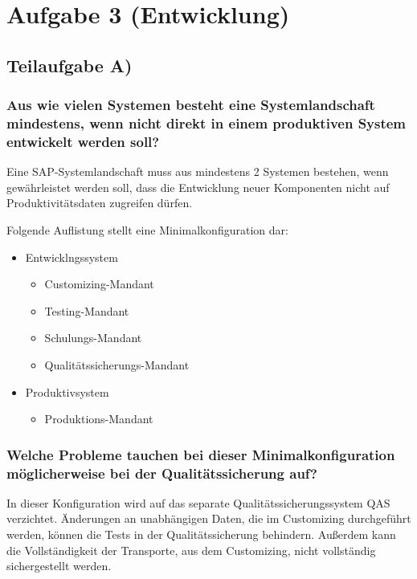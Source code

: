 \section{Aufgabe 3 (Entwicklung)}

\subsection{Teilaufgabe A)}
\subsubsection{Aus wie vielen Systemen besteht eine Systemlandschaft mindestens,
wenn nicht direkt in einem produktiven System entwickelt werden soll? }

Eine SAP-Systemlandschaft muss aus mindestens 2 Systemen bestehen, wenn
gewährleistet werden soll, dass die Entwicklung neuer Komponenten nicht auf
Produktivitätsdaten zugreifen dürfen.

Folgende Auflistung stellt eine Minimalkonfiguration dar:
\begin{itemize}
  \item Entwicklngssystem
  	\begin{itemize}
  	  \item Customizing-Mandant
  	  \item Testing-Mandant
  	  \item Schulungs-Mandant
  	  \item Qualitätssicherungs-Mandant
  	\end{itemize}
  \item Produktivsystem
  	\begin{itemize}
  	  \item Produktions-Mandant
  	\end{itemize}
\end{itemize}

\subsubsection{Welche Probleme tauchen bei dieser
Minimalkonfiguration möglicherweise bei der Qualitätssicherung auf?}

In dieser Konfiguration wird auf das separate Qualitätssicherungssystem QAS
verzichtet. Änderungen an unabhängigen Daten, die im Customizing
durchgeführt werden, können die Tests in der Qualitätssicherung
behindern. Außerdem kann die Vollständigkeit der Transporte, aus dem
Customizing, nicht vollständig sichergestellt werden. 

